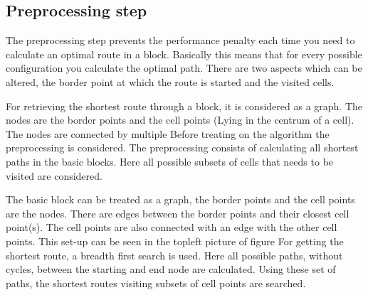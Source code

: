 \subsection{Preprocessing step}

The preprocessing step prevents the performance penalty each time you need to
calculate an optimal route in a block. Basically this means that for every
possible configuration you calculate the optimal path. There are two aspects
which can be altered, the border point at which the route is started and the
visited cells.

For retrieving the shortest route through a block, it is considered as a
graph. The nodes are the border points and the cell points (Lying in the
centrum of a cell). The nodes are connected by multiple Before treating on the
algorithm the preprocessing is considered.  The preprocessing consists of
calculating all shortest paths in the basic blocks. Here all possible subsets
of cells that needs to be visited are considered.

The basic block can be treated as a graph, the border points and the cell
points are the nodes. There are edges between the border points and their
closest cell point(s). The cell points are also connected with an edge with
the other cell points. This set-up can be seen in the topleft picture of
figure %
For getting the shortest route, a breadth
first search is used. Here all possible paths, without cycles, between the
starting and end node are calculated. Using these set of paths, the shortest
routes visiting subsets of cell points are searched.


